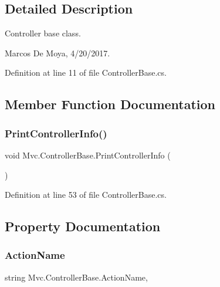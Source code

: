\subsection{Detailed Description}
Controller base class. 

Marcos De Moya, 4/20/2017. 

Definition at line 11 of file Controller\+Base.\+cs.



\subsection{Member Function Documentation}
\mbox{\label{class_mvc_1_1_controller_base_a57d2cea3763d2808292b32f1020113da}} 
\subsubsection{\texorpdfstring{Print\+Controller\+Info()}{PrintControllerInfo()}}
{\footnotesize\ttfamily void Mvc.\+Controller\+Base.\+Print\+Controller\+Info (\begin{DoxyParamCaption}{ }\end{DoxyParamCaption})}



Definition at line 53 of file Controller\+Base.\+cs.



\subsection{Property Documentation}
\mbox{\label{class_mvc_1_1_controller_base_ae79bdad6f98b08d8a65efb7d3c1ab2d7}} 
\subsubsection{\texorpdfstring{Action\+Name}{ActionName}}
{\footnotesize\ttfamily string Mvc.\+Controller\+Base.\+Action\+Name\hspace{0.3cm}{\ttfamily [get]}, {\ttfamily [set]}}




